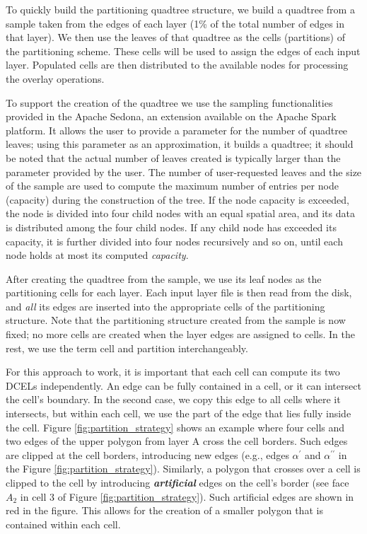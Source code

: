 To quickly build the partitioning quadtree structure, we build a quadtree from a sample taken from the edges of each layer (1\% of the total number of edges in that layer). We then use the leaves of that quadtree as the cells (partitions) of the partitioning scheme. These cells will be used to assign the edges of each input layer. Populated cells are then distributed to the available nodes for processing the overlay operations.

To support the creation of the quadtree we use the sampling functionalities provided in the Apache Sedona, an extension available on the Apache Spark platform. It allows the user to provide a parameter for the number of quadtree leaves; using this parameter as an approximation, it builds a quadtree; it should be noted that the actual number of leaves created is typically larger than the parameter provided by the user. The number of user-requested leaves and the size of the sample are used to compute the maximum number of entries per node (capacity) during the construction of the tree.  If the node capacity is exceeded, the node is divided into four child nodes with an equal spatial area, and its data is distributed among the four child nodes.  If any child node has exceeded its capacity, it is further divided into four nodes recursively and so on, until each node holds at most its computed \textit{capacity}.

After creating the quadtree from the sample, we use its leaf nodes as the partitioning cells for each layer. Each input layer file is then read from the disk, and \textit{all} its edges are inserted into the appropriate cells of the partitioning structure. Note that the partitioning structure created from the sample is now fixed; no more cells are created when the layer edges are assigned to cells. In the rest, we use the term cell and partition interchangeably.

For this approach to work, it is important that each cell can compute its two DCELs independently. An edge can be fully contained in a cell, or it can intersect the cell's boundary. In the second case, we copy this edge to all cells where it intersects, but within each cell, we use the part of the edge that lies fully inside the cell. Figure \ref{fig:partition_strategy} shows an example where four cells and two edges of the upper polygon from layer A cross the cell borders.
Such edges are clipped at the cell borders, introducing new edges (e.g., edges $\alpha^{\prime}$ and $\alpha^{\prime \prime}$ in the Figure \ref{fig:partition_strategy}).
Similarly, a polygon that crosses over a cell is clipped to the cell by introducing \textit{\textbf{artificial}} edges on the cell's border (see face $A_2$ in cell 3 of Figure \ref{fig:partition_strategy}). Such artificial edges are shown in red in the figure. This allows for the creation of a smaller polygon that is contained within each cell.

